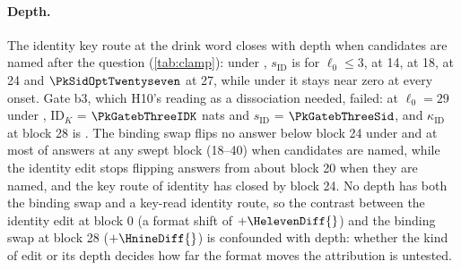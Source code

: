 \paragraph{Depth.} The identity key route at the drink word closes with depth when candidates are named after the question (\cref{tab:clamp}): under \fmtOpt{}, $s_{\mathrm{ID}}$ is \PkSidOptZero{} for $\ell_0 \leq 3$, \PkSidOptFourteen{} at 14, \PkSidOptEighteen{} at 18, \PkSidOptTwentyfour{} at 24 and $\PkSidOptTwentyseven$ at 27, while under \fmtNone{} it stays near zero at every onset. Gate b3, which H10's reading as a dissociation needed, failed: at $\ell_0 = 29$ under \fmtOpt{}, $\mathrm{ID}_K$ = $\PkGatebThreeIDK$ nats and $s_{\mathrm{ID}}$ = $\PkGatebThreeSid$, and $\kappa_{\mathrm{ID}}$ at block 28 is \PkGatebThreeKappa{}. The binding swap flips no answer below block 24 under \fmtNone{} and at most \PkSweepIIABindQnamesTwentythree{} of answers at any swept block (18--40) when candidates are named, while the identity edit stops flipping answers from about block 20 when they are named, and the key route of identity has closed by block 24. No depth has both the binding swap and a key-read identity route, so the contrast between the identity edit at block 0 (a format shift of $+\HelevenDiff{}$) and the binding swap at block 28 ($+\HnineDiff{}$) is confounded with depth: whether the kind of edit or its depth decides how far the format moves the attribution is untested.

